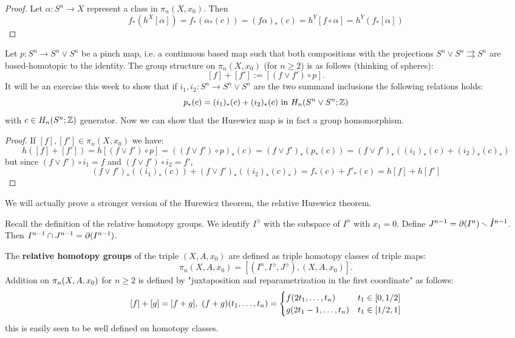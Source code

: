 \begin{proof}
Let $\alpha:S^n\to X$ represent a class in $\pi_n(X,x_0)$. Then
\[f_*(h^X[\alpha])=f_*(\alpha_*(c))=(f\alpha)_*(c)=h^Y[f\circ\alpha]=h^Y(f_*[\alpha])\]
\end{proof}

 Let $p:S^n\to S^n\vee S^n$ be a pinch map, i.e. a continuous based map such that both compositions with the projections $S^n\vee S^n\rightrightarrows S^n$ are based-homotopic to the identity. The group structure on $\pi_n(X,x_0)$ (for $n\geq2$) is as follows (thinking of spheres):
\[[f]+[f']:=[(f\vee f')\circ p].\]
It will be an exercise this week to show that if $i_1,i_2:S^n\to S^n\vee S^n$ are the two summand inclusions the following relations holds:
\[p_*(c)=(i_1)_*(c)+(i_2)_*(c) \text{ in } H_n(S^n\vee S^n;{\mathbb Z})\]
with $c\in H_n(S^n;{\mathbb Z})$ generator.
Now we can show that the Hurewicz map is in fact a group homomorphism.
\begin{proof}
If $[f],[f']\in\pi_n(X,x_0)$ we have:
\[h([f]+[f'])=h[(f\vee f')\circ p]=((f\vee f')\circ p)_*(c)=(f\vee f')_*(p_*(c))=(f\vee f')_*((i_1)_*(c)+(i_2)_*(c)_*)\]
but since $(f\vee f')\circ i_1=f$ and $(f\vee f')\circ i_2=f'$,
\[(f\vee f')_*((i_1)_*(c))+(f\vee f')_*((i_2)_*(c)_*)=f_*(c)+f'_*(c)=h[f]+h[f']\]
\end{proof}

We will actually prove a stronger version of the Hurewicz theorem, the relative Hurewicz theorem.

Recall the definition of the relative homotopy groups. We identify $I^\ni$ with the subspace of $I^n$ with $x_1=0$. Define $J^{n-1}=\partial (I^n)\smallsetminus\mathring{I}^{n-1}$. Then $I^{n-1}\cap J^{n-1}=\partial(I^{n-1})$.

The \textbf{relative homotopy groups} of the triple $(X,A,x_0)$ are defined as triple homotopy classes of triple maps:
\[\pi_n(X,A,x_0)=[(I^n, I^\ni, J^\ni),(X,A,x_0)].\]
Addition on $\pi_n(X,A,x_0)$ for $n\geq 2$ is defined by "juxtaposition and reparametrization in the first coordinate" as follows:
\[[f]+[g]=[f+g],\ (f+g)(\nn{t}{n})=\begin{cases}f(2t_1,\dots,t_n) & t_1\in[0,1/2] \\ g(2t_1-1,\dots,t_n) & t_1\in[1/2,1]\end{cases}\]
this is easily seen to be well defined on homotopy classes.

